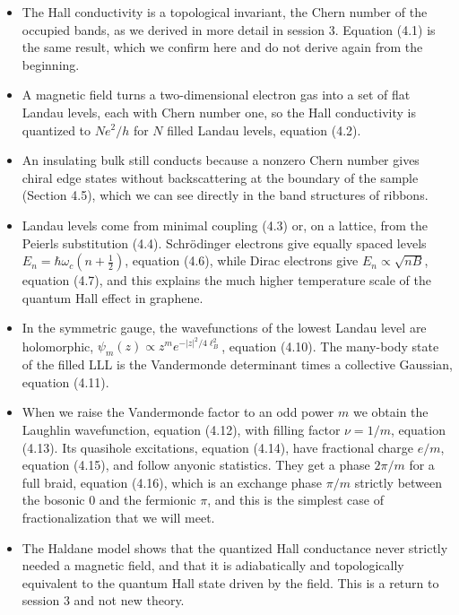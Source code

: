 \begin{itemize}
\item The Hall conductivity is a topological invariant, the Chern number of the occupied bands, as
  we derived in more detail in session 3. Equation (4.1) is the same result, which we confirm here
  and do not derive again from the beginning.
\item A magnetic field turns a two-dimensional electron gas into a set of flat Landau levels, each
  with Chern number one, so the Hall conductivity is quantized to $N e^2/h$ for $N$ filled Landau
  levels, equation (4.2).
\item An insulating bulk still conducts because a nonzero Chern number gives chiral edge states
  without backscattering at the boundary of the sample (Section 4.5), which we can see directly in
  the band structures of ribbons.
\item Landau levels come from minimal coupling (4.3) or, on a lattice, from the Peierls
  substitution (4.4). Schrödinger electrons give equally spaced levels
  $E_n=\hbar\omega_c(n+\tfrac12)$, equation (4.6), while Dirac electrons give $E_n\propto\sqrt{nB}$,
  equation (4.7), and this explains the much higher temperature scale of the quantum Hall effect in
  graphene.
\item In the symmetric gauge, the wavefunctions of the lowest Landau level are holomorphic,
  $\psi_m(z)\propto z^m e^{-|z|^2/4\ell_B^2}$, equation (4.10). The many-body state of the filled
  LLL is the Vandermonde determinant times a collective Gaussian, equation (4.11).
\item When we raise the Vandermonde factor to an odd power $m$ we obtain the Laughlin wavefunction,
  equation (4.12), with filling factor $\nu=1/m$, equation (4.13). Its quasihole excitations,
  equation (4.14), have fractional charge $e/m$, equation (4.15), and follow anyonic statistics.
  They get a phase $2\pi/m$ for a full braid, equation (4.16), which is an exchange phase $\pi/m$
  strictly between the bosonic $0$ and the fermionic $\pi$, and this is the simplest case of
  fractionalization that we will meet.
\item The Haldane model shows that the quantized Hall conductance never strictly needed a magnetic
  field, and that it is adiabatically and topologically equivalent to the quantum Hall state driven
  by the field. This is a return to session 3 and not new theory.
\end{itemize}

